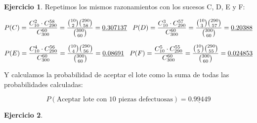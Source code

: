 \documentclass[a4paper, 12pt]{article}
\theoremstyle{definition}
\newtheorem{ej}{Ejercicio}
\begin{document}
\begin{ej}
Repetimos los mismos razonamientos con los sucesos C, D, E y F:

\[
    P(C) = \frac{C_{10}^{2} \cdot C_{290}^{58}}{C_{300}^{60}} = \frac{\binom{10}{2} \binom{290}{58}}{\binom{300}{60}} = \underline{0.307137} \hspace{0.3cm}
    P(D) = \frac{C_{10}^{3} \cdot C_{290}^{57}}{C_{300}^{60}} = \frac{\binom{10}{3} \binom{290}{57}}{\binom{300}{60}} = \underline{0.20388}
\]

\[
    P(E) = \frac{C_{10}^{4} \cdot C_{290}^{56}}{C_{300}^{60}} = \frac{\binom{10}{4} \binom{290}{56}}{\binom{300}{60}} = \underline{0.08691} \hspace{0.3cm}
    P(F) = \frac{C_{10}^{5} \cdot C_{290}^{55}}{C_{300}^{60}} = \frac{\binom{10}{5} \binom{290}{55}}{\binom{300}{60}} = \underline{0.024853}
\]

Y calculamos la probabilidad de aceptar el lote como la suma de todas las probabilidades calculadas:

\[
    P(\text{Aceptar lote con 10 piezas defectuosas}) = \underline{0.99449}
\]


\end{ej}

\begin{ej}
\end{ej}
\end{document}
